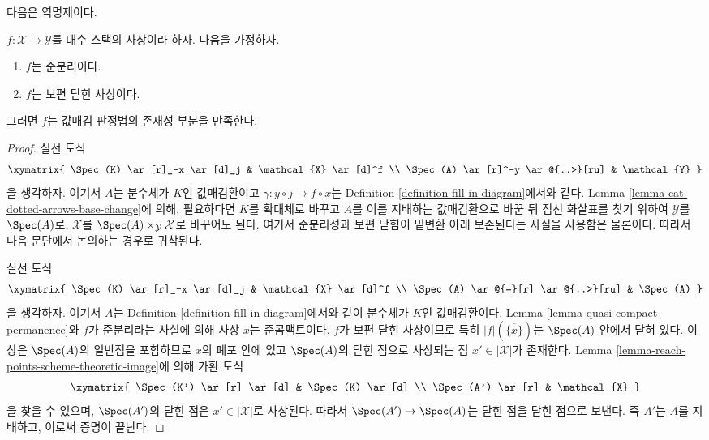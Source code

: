 \noindent
다음은 역명제이다.

\begin{lemma}
\label{lemma-converse-existence-universally-closed}
$f : \mathcal{X} \to \mathcal{Y}$를 대수 스택의 사상이라 하자. 다음을
가정하자.
\begin{enumerate}
\item $f$는 준분리이다.
\item $f$는 보편 닫힌 사상이다.
\end{enumerate}
그러면 $f$는 값매김 판정법의 존재성 부분을 만족한다.
\end{lemma}

\begin{proof}
실선 도식
$$
\xymatrix{
\Spec(K) \ar[r]_-x \ar[d]_j & \mathcal{X} \ar[d]^f \\
\Spec(A) \ar[r]^-y \ar@{..>}[ru] & \mathcal{Y}
}
$$
을 생각하자. 여기서 $A$는 분수체가 $K$인 값매김환이고
$\gamma : y \circ j \longrightarrow f \circ x$는 Definition
\ref{definition-fill-in-diagram}에서와 같다. Lemma
\ref{lemma-cat-dotted-arrows-base-change}에 의해, 필요하다면 $K$를 확대체로
바꾸고 $A$를 이를 지배하는 값매김환으로 바꾼 뒤 점선 화살표를 찾기
위하여 $\mathcal{Y}$를 $\Spec(A)$로, $\mathcal{X}$를
$\Spec(A) \times_\mathcal{Y} \mathcal{X}$로 바꾸어도 된다. 여기서
준분리성과 보편 닫힘이 밑변환 아래 보존된다는 사실을 사용함은 물론이다.
따라서 다음 문단에서 논의하는 경우로 귀착된다.

\medskip\noindent
실선 도식
$$
\xymatrix{
\Spec(K) \ar[r]_-x \ar[d]_j & \mathcal{X} \ar[d]^f \\
\Spec(A) \ar@{=}[r] \ar@{..>}[ru] & \Spec(A)
}
$$
을 생각하자. 여기서 $A$는 Definition
\ref{definition-fill-in-diagram}에서와 같이 분수체가 $K$인 값매김환이다.
Lemma \ref{lemma-quasi-compact-permanence}와 $f$가 준분리라는 사실에 의해
사상 $x$는 준콤팩트이다. $f$가 보편 닫힌 사상이므로 특히
$|f|(\overline{\{x\}})$는 $\Spec(A)$ 안에서 닫혀 있다. 이 상은
$\Spec(A)$의 일반점을 포함하므로 $x$의 폐포 안에 있고 $\Spec(A)$의
닫힌 점으로 사상되는 점 $x' \in |\mathcal{X}|$가 존재한다. Lemma
\ref{lemma-reach-points-scheme-theoretic-image}에 의해 가환 도식
$$
\xymatrix{
\Spec(K') \ar[r] \ar[d] & \Spec(K) \ar[d] \\
\Spec(A') \ar[r] & \mathcal{X}
}
$$
을 찾을 수 있으며, $\Spec(A')$의 닫힌 점은
$x' \in |\mathcal{X}|$로 사상된다. 따라서
$\Spec(A') \to \Spec(A)$는 닫힌 점을 닫힌 점으로 보낸다. 즉 $A'$는
$A$를 지배하고, 이로써 증명이 끝난다.
\end{proof}





